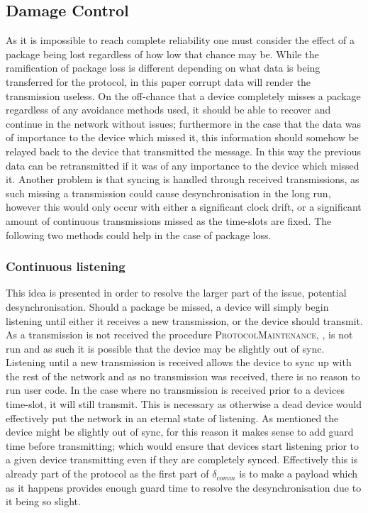 \subsection{Damage Control}
As it is impossible to reach complete reliability one must consider the effect of a package being lost regardless of how low that chance may be.
While the ramification of package loss is different depending on what data is being transferred for the protocol, in this paper corrupt data will render the transmission useless.
On the off-chance that a device completely misses a package regardless of any avoidance methods used, it should be able to recover and continue in the network without issues; furthermore in the case that the data was of importance to the device which missed it, this information should somehow be relayed back to the device that transmitted the message.
In this way the previous data can be retransmitted if it was of any importance to the device which missed it.
Another problem is that syncing is handled through received transmissions, as such missing a transmission could cause desynchronisation in the long run, however this would only occur with either a significant clock drift, or a significant amount of continuous transmissions missed as the time-slots are fixed.
The following two methods could help in the case of package loss.

\subsubsection*{Continuous listening}\label{contListen}
This idea is presented in order to resolve the larger part of the issue, potential desynchronisation.
Should a package be missed, a device will simply begin listening until either it receives a new transmission, or the device should transmit.
As a transmission is not received the procedure \textsc{ProtocolMaintenance}, , is not run and as such it is possible that the device may be slightly out of sync.
Listening until a new transmission is received allows the device to sync up with the rest of the network and as no transmission was received, there is no reason to run user code.
In the case where no transmission is received prior to a devices time-slot, it will still transmit.
This is necessary as otherwise a dead device would effectively put the network in an eternal state of listening.
As mentioned the device might be slightly out of sync, for this reason it makes sense to add guard time before transmitting; which would ensure that devices start listening prior to a given device transmitting even if they are completely synced.
Effectively this is already part of the protocol as the first part of $\delta_{comm}$ is to make a payload which as it happens provides enough guard time to resolve the desynchronisation due to it being so slight.

